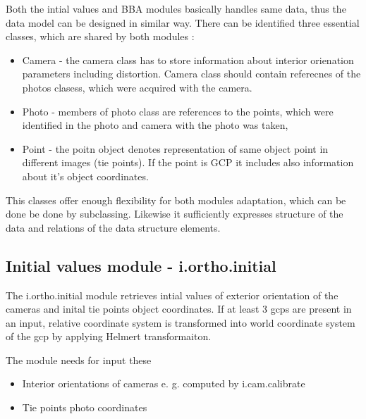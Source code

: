 \documentclass[a4paper,12pt]{report}
\begin{document}
\begin{itemize}
Both the intial values and BBA modules basically handles  same data, thus 
the data model can be designed in similar way. There can be 
identified three essential classes, which are shared by both modules :
\begin{itemize}
\item Camera - the camera class has to store information about interior orienation 
parameters including distortion. Camera class should contain referecnes of the photos
clasess, which were acquired with the camera.
\item Photo - members of photo class are references to the points, which were identified 
	    in the photo and camera with the photo was taken,
\item Point - the poitn object denotes representation of same object point in different images (tie points).
 If the point is GCP it includes also information about it's object coordinates. 
\end{itemize}


This classes offer enough flexibility for both modules adaptation, which can be done be done by subclassing. 
Likewise it sufficiently expresses  structure of the data and relations of the data structure elements.

\subsection{Initial values module - i.ortho.initial}

The i.ortho.initial module retrieves intial values of exterior orientation of the cameras and inital tie points object coordinates. If at least 3 gcps are 
present in an input, relative coordinate system is transformed into world coordinate system of the gcp by applying Helmert transformaiton. 


The module needs for input these 
\begin{itemize}
\item Interior orientations of cameras e. g. computed by i.cam.calibrate
\item Tie points photo coordinates 
\end{itemize}


\end{itemize}
\end{document}
